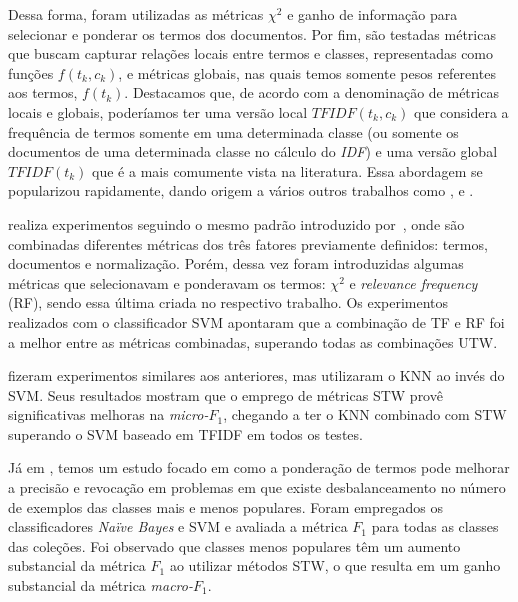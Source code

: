 Dessa forma, foram utilizadas as métricas $\chi^2$ e ganho de informação para selecionar e ponderar os termos dos documentos.
Por fim, são testadas métricas que buscam capturar relações locais entre termos e classes, representadas como funções $f(t_k, c_k)$, e métricas globais, nas quais temos somente pesos referentes aos termos, $f(t_k)$.
Destacamos que, de acordo com a denominação de métricas locais e globais, poderíamos ter uma versão local \textit{$TFIDF(t_k, c_k)$} que considera a frequência de termos somente em uma determinada classe (ou somente os documentos de uma determinada classe no cálculo do \textit{IDF}) e uma versão global \textit{$TFIDF(t_k)$} que é a mais comumente vista na literatura.
Essa abordagem se popularizou rapidamente, dando origem a vários outros trabalhos como \cite{Lan05}, \cite{Batal09} e \cite{Liu09}.

\cite{Lan05} realiza experimentos seguindo o mesmo padrão introduzido por~\cite{Salton88}, onde são combinadas diferentes métricas dos três fatores previamente definidos: termos, documentos e normalização.
Porém, dessa vez foram introduzidas algumas métricas que selecionavam e ponderavam os termos: $\chi^2$ e \textit{relevance frequency} (\textsc{RF}), sendo essa última criada no respectivo trabalho. Os experimentos realizados com o classificador \textsc{SVM} apontaram que a combinação de \textsc{TF} e \textsc{RF} foi a melhor entre as métricas combinadas, superando todas as combinações \textsc{UTW}.

\cite{Batal09} fizeram experimentos similares aos anteriores, mas utilizaram o \textsc{KNN} ao invés do \textsc{SVM}. Seus resultados mostram que o emprego de métricas \textsc{STW} provê significativas melhoras na \textit{micro-$F_1$}, chegando a ter o \textsc{KNN} combinado com \textsc{STW} superando o \textsc{SVM} baseado em \textsc{TFIDF} em todos os testes.

Já em \cite{Liu09}, temos um estudo focado em como
 a ponderação de termos pode melhorar a precisão e revocação em problemas em que existe desbalanceamento no número de exemplos das classes mais e menos populares. Foram empregados os classificadores \textit{Naïve Bayes} e \textsc{SVM} e avaliada a métrica $F_1$ para todas as classes das coleções. Foi observado que classes menos populares têm um aumento substancial da métrica $F_1$ ao utilizar métodos \textsc{STW}, o que resulta em um ganho substancial da métrica \textit{macro-$F_1$}.


